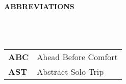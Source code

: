 
{\Large \bf ABBREVIATIONS}
\\
\\
\\
\\
\begin{tabular}{ll}
        {\large \bf ABC}    & Ahead Before Comfort \\
        {\large \bf AST}    & Abstract Solo Trip \\

\end{tabular}
\clearpage

